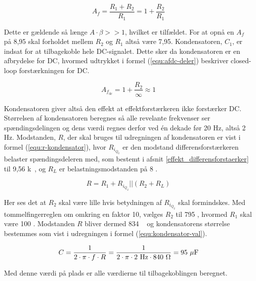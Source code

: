 \begin{equation}
\label{equ:af-deler}
A_f = \frac{R_1 + R_2}{R_1} = 1 + \frac{R_2}{R_1}
\end{equation}

Dette er gældende så længe $A \cdot \beta >> 1$, hvilket er tilfældet. For at opnå en $A_f$ på 8,95 skal forholdet mellem $R_2$ og $R_1$ altså være 7,95. Kondensatoren, $C_1$, er indsat for at tilbagekoble hele DC-signalet. Dette sker da kondensatoren er en afbrydelse for DC, hvormed udtrykket i formel (\ref{equ:afdc-deler}) beskriver closed-loop forstærkningen for DC.

\begin{equation}
\label{equ:afdc-deler}
A_{f_\mathrm{dc}} = 1 + \frac{R_2}{\infty} \approx 1
\end{equation}

Kondensatoren giver altså den effekt at effektforstærkeren ikke forstærker DC. Størrelsen af kondensatoren beregnes så alle revelante frekvenser ser spændingsdelingen og dens værdi regnes derfor ved én dekade før 20 Hz, altså 2 Hz. Modstanden, $R$, der skal bruges til udregningen af kondensatoren er vist i formel (\ref{equ:r-kondensator}), hvor $R_{i_{Q_2}}$ er den modstand differensforstærkeren belaster spændingsdeleren med, som bestemt i afsnit \ref{effekt_differensforstaerker} til 9,56 k\ohm~, og $R_L$ er belastningsmodstanden på 8 \ohm.

\begin{equation}
\label{equ:r-kondensator}
R = R_1 + R_{i_{Q_2}}||(R_2 + R_L)
\end{equation}

Her ses det at $R_2$ skal være lille hvis betydningen af $R_{i_{Q_2}}$ skal formindskes. Med tommelfingerreglen om omkring en faktor 10, vælges $R_2$ til 795 \ohm, hvormed $R_1$ skal være 100 \ohm. Modstanden $R$ bliver dermed 834 \ohm~ og kondensatorens størrelse bestemmes som vist i udregningen i formel (\ref{equ:kondensator-val}).

\begin{equation}
\label{equ:kondensator-val}
C = \frac{1}{2 \cdot \pi \cdot f \cdot R} = \frac{1}{2 \cdot \pi \cdot \mathrm{2~Hz} \cdot \mathrm{840~\ohm}} = \mathrm{95~\mu F}
\end{equation}

Med denne værdi på plads er alle værdierne til tilbagekoblingen beregnet.